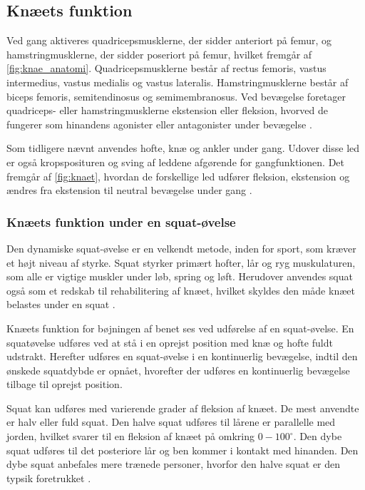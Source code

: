 \subsection{Knæets funktion}
Ved gang aktiveres quadricepsmusklerne, der sidder anteriort på femur, og hamstringmusklerne, der sidder poseriort på femur, hvilket fremgår af \autoref{fig:knae_anatomi}. Quadricepsmusklerne består af rectus femoris, vastus intermedius, vastus medialis og vastus lateralis. Hamstringmusklerne består af biceps femoris, semitendinosus og semimembranosus. Ved bevægelse foretager quadriceps- eller hamstringmusklerne ekstension eller fleksion, hvorved de fungerer som hinandens agonister eller antagonister under bevægelse \citep{martini2012}. 

Som tidligere nævnt anvendes hofte, knæ og ankler under gang. Udover disse led er også kropsposituren og sving af leddene afgørende for gangfunktionen. Det fremgår af \autoref{fig:knaet}, hvordan de forskellige led udfører fleksion, ekstension og ændres fra ekstension til neutral bevægelse under gang \citep{martini2012}.

\subsubsection{Knæets funktion under en squat-øvelse}
Den dynamiske squat-øvelse er en velkendt metode, inden for sport, som kræver et højt niveau af styrke. Squat styrker primært hofter, lår og ryg muskulaturen, som alle er vigtige muskler under løb, spring og løft. Herudover anvendes squat også som et redskab til rehabilitering af knæet, hvilket skyldes den måde knæet belastes under en squat \citep{escamilla2001}. 

Knæets funktion for bøjningen af benet ses ved udførelse af en squat-øvelse. En squatøvelse udføres ved at stå i en oprejst position med knæ og hofte fuldt udstrakt. Herefter udføres en squat-øvelse i en kontinuerlig bevægelse, indtil den ønskede squatdybde er opnået, hvorefter der udføres en kontinuerlig bevægelse tilbage til oprejst position.\citep{escamilla2001}

Squat kan udføres med varierende grader af fleksion af knæet. De mest anvendte er halv eller fuld squat. Den halve squat udføres til lårene er parallelle med jorden, hvilket svarer til en fleksion af knæet på omkring $0-100^{\circ}$. Den dybe squat udføres til det posteriore lår og ben kommer i kontakt med hinanden. Den dybe squat anbefales mere trænede personer, hvorfor den halve squat er den typsik foretrukket \citep{escamilla2001}.

